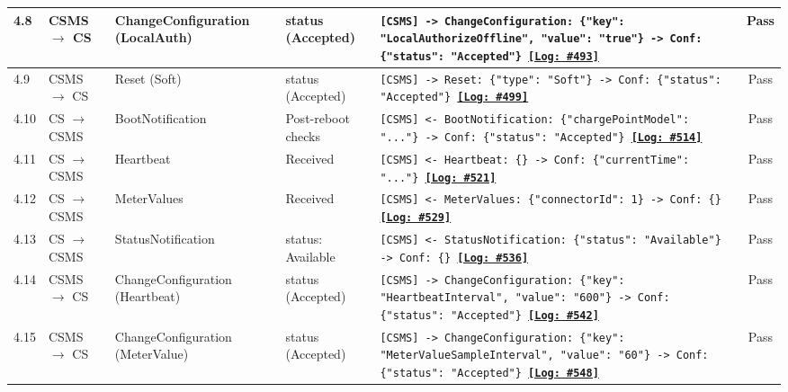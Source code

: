 \documentclass[10pt, a4paper, landscape]{article}
\begin{document}
\begin{longtable}{|p{1.0cm}|p{2.5cm}|p{4.0cm}|p{5.0cm}|p{10.0cm}|c|}
\hline
4.8 & CSMS $\to$ CS & ChangeConfiguration (LocalAuth) & status (Accepted) & \footnotesize\texttt{[CSMS] -> ChangeConfiguration: \{"key": "LocalAuthorizeOffline", "value": "true"\} \newline [CS] -> Conf: \{"status": "Accepted"\} \newline \hyperref[log:4.8]{\textbf{[Log: \#493]}}} & Pass \\
\hline
4.9 & CSMS $\to$ CS & Reset (Soft) & status (Accepted) & \footnotesize\texttt{[CSMS] -> Reset: \{"type": "Soft"\} \newline [CS] -> Conf: \{"status": "Accepted"\} \newline \hyperref[log:4.9]{\textbf{[Log: \#499]}}} & Pass \\
\hline
4.10 & CS $\to$ CSMS & BootNotification & Post-reboot checks & \footnotesize\texttt{[CSMS] <- BootNotification: \{"chargePointModel": "..."\} \newline [CSMS] -> Conf: \{"status": "Accepted"\} \newline \hyperref[log:4.10]{\textbf{[Log: \#514]}}} & Pass \\
\hline
4.11 & CS $\to$ CSMS & Heartbeat & Received & \footnotesize\texttt{[CSMS] <- Heartbeat: \{\} \newline [CSMS] -> Conf: \{"currentTime": "..."\} \newline \hyperref[log:4.11]{\textbf{[Log: \#521]}}} & Pass \\
\hline
4.12 & CS $\to$ CSMS & MeterValues & Received & \footnotesize\texttt{[CSMS] <- MeterValues: \{"connectorId": 1\} \newline [CSMS] -> Conf: \{\} \newline \hyperref[log:4.12]{\textbf{[Log: \#529]}}} & Pass \\
\hline
4.13 & CS $\to$ CSMS & StatusNotification & status: Available & \footnotesize\texttt{[CSMS] <- StatusNotification: \{"status": "Available"\} \newline [CSMS] -> Conf: \{\} \newline \hyperref[log:4.13]{\textbf{[Log: \#536]}}} & Pass \\
\hline
4.14 & CSMS $\to$ CS & ChangeConfiguration (Heartbeat) & status (Accepted) & \footnotesize\texttt{[CSMS] -> ChangeConfiguration: \{"key": "HeartbeatInterval", "value": "600"\} \newline [CS] -> Conf: \{"status": "Accepted"\} \newline \hyperref[log:4.14]{\textbf{[Log: \#542]}}} & Pass \\
\hline
4.15 & CSMS $\to$ CS & ChangeConfiguration (MeterValue) & status (Accepted) & \footnotesize\texttt{[CSMS] -> ChangeConfiguration: \{"key": "MeterValueSampleInterval", "value": "60"\} \newline [CS] -> Conf: \{"status": "Accepted"\} \newline \hyperref[log:4.15]{\textbf{[Log: \#548]}}} & Pass \\

\end{longtable}
\end{document}
